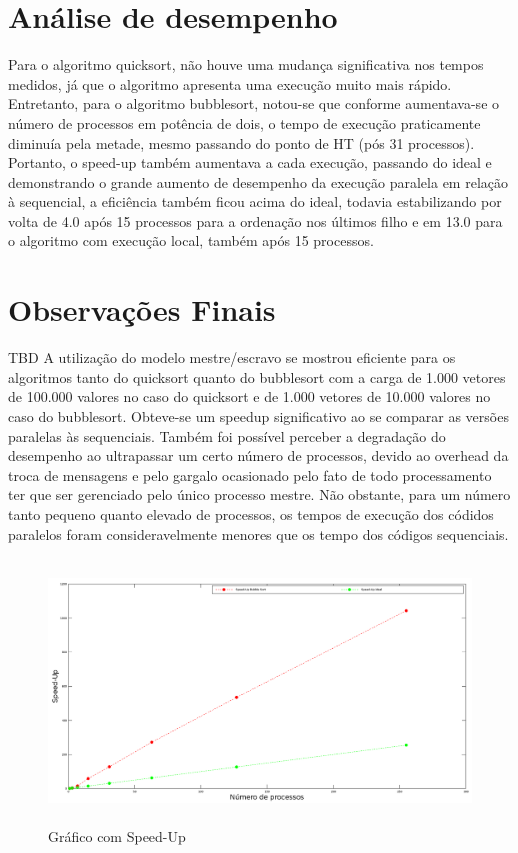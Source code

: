 \documentclass{article}
\begin{document}
\begin{multicols*}{2}
\section{Análise de desempenho}
Para o algoritmo quicksort, não houve uma mudança significativa nos tempos medidos, já que o algoritmo apresenta uma execução muito mais rápido. Entretanto, para o algoritmo bubblesort, notou-se que conforme aumentava-se o número de processos em potência de dois, o tempo de execução praticamente diminuía pela metade, mesmo passando do ponto de HT (pós 31 processos). Portanto, o speed-up também aumentava a cada execução, passando do ideal e demonstrando o grande aumento de desempenho da execução paralela em relação à sequencial, a eficiência também ficou acima do ideal, todavia estabilizando por volta de 4.0 após 15 processos para a ordenação nos últimos filho e em 13.0 para o algoritmo com execução local, também após 15 processos.

\section{Observações Finais}
TBD\newline
A utilização do modelo mestre/escravo se mostrou eficiente para os algoritmos tanto do quicksort quanto do bubblesort com a carga de 1.000 vetores de 100.000 valores no caso do quicksort e de 1.000 vetores de 10.000 valores no caso do bubblesort. Obteve-se um speedup significativo ao se comparar as versões paralelas às sequenciais. Também foi possível perceber a degradação do desempenho ao ultrapassar um certo número de processos, devido ao overhead da troca de mensagens e pelo gargalo ocasionado pelo fato de todo processamento ter que ser gerenciado pelo único processo mestre. Não obstante, para um número tanto pequeno quanto elevado de processos, os tempos de execução dos códidos paralelos foram consideravelmente menores que os tempo dos códigos sequenciais.

\end{multicols*}

\newpage

\begin{figure}[H]
            \centering
            \vspace{-0.3em}
            \includegraphics[width=14cm, height=7cm]{sup.png}
            \vspace{-0.6em}
            \caption{Gráfico com Speed-Up}
            \vspace{-1.1em}
\end{figure}
\end{document}
